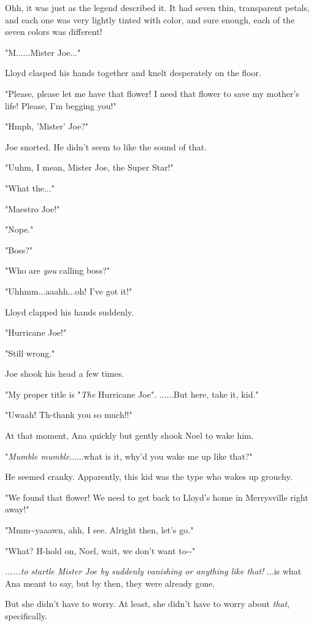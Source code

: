 \documentclass[
]{article}
\begin{document}
Ohh, it was just as the legend described it. It had seven thin,
transparent petals, and each one was very lightly tinted with color, and
sure enough, each of the seven colors was different!

"M......Mister Joe..."

Lloyd clasped his hands together and knelt desperately on the floor.

"Please, please let me have that flower! I need that flower to save my
mother's life! Please, I'm begging you!"

"Hmph, 'Mister' Joe?"

Joe snorted. He didn't seem to like the sound of that.

"Uuhm, I mean, Mister Joe, the Super Star!"

"What the..."

"Maestro Joe!"

"Nope."

"Boss?"

"Who are \emph{you} calling boss?"

"Uhhmm...aaahh...oh! I've got it!"

Lloyd clapped his hands suddenly.

"Hurricane Joe!"

"Still wrong."

Joe shook his head a few times.

"My proper title is "\emph{The} Hurricane Joe". ......But here, take it,
kid."

"Uwaah! Th-thank you so much!!"

At that moment, Ana quickly but gently shook Noel to wake him.

"\emph{Mumble mumble}......what is it, why'd you wake me up like that?"

He seemed cranky. Apparently, this kid was the type who wakes up
grouchy.

"We found that flower! We need to get back to Lloyd's home in
Merrysville right away!"

"Mmm\textasciitilde yaaawn, ahh, I see. Alright then, let's go."

"What? H-hold on, Noel, wait, we don't want to-\/-"

\emph{......to startle Mister Joe by suddenly vanishing or anything like
that!} ...is what Ana meant to say, but by then, they were already gone.

But she didn't have to worry. At least, she didn't have to worry about
\emph{that}, specifically.
\end{document}

